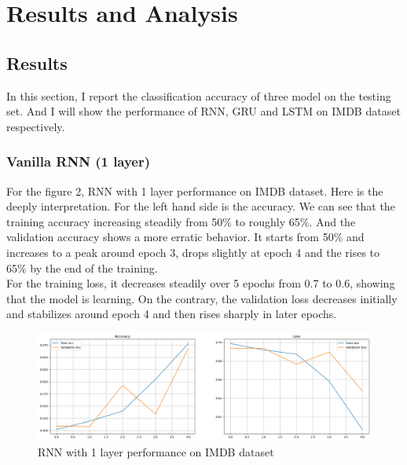 \documentclass[12pt,a4paper]{article}
\begin{document}
\section{Results and Analysis}
\subsection{Results}
In this section, I report the classification accuracy of three model on the testing set. And I will show the performance of RNN, GRU and LSTM on IMDB dataset respectively. 
\subsubsection{Vanilla RNN (1 layer)}
For the figure 2, RNN with 1 layer performance on IMDB dataset. Here is the deeply interpretation. For the left hand side is the accuracy. We can see that the training accuracy increasing steadily from 50\% to roughly 65\%. And the validation accuracy shows a more erratic behavior. It starts from 50\% and increases to a peak around epoch 3, drops slightly at epoch 4 and the rises to 65\% by the end of the training. 
\\[1ex]
For the training loss, it decreases steadily over 5 epochs from 0.7 to 0.6, showing that the model is learning. On the contrary, the validation loss decreases initially and stabilizes around epoch 4 and then rises sharply in later epochs. 
\begin{figure}[h!]
    \centering
    \includegraphics[width=1\textwidth]{../Pic/rnn1.png} 
    \caption{RNN with 1 layer performance on IMDB dataset}
\end{figure}
\end{document}
